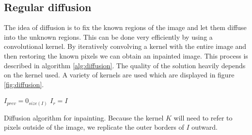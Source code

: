 \subsection{Regular diffusion}
The idea of diffusion is to fix the known regions of the image and let them diffuse into the unknown regions. This can be done very efficiently by using a convolutional kernel. By iteratively convolving a kernel with the entire image and then restoring the known pixels we can obtain an inpainted image. This process is described in algorithm \ref{alg:diffusion}. The quality of the solution heavily depends on the kernel used. A variety of kernels are used which are displayed in figure \ref{fig:diffusion}.

\begin{algorithm}
	$I_{prev} = 0_{size(I)}$\;
	$I_{r} = I$\;
	\quad
\caption{Diffusion algorithm for inpainting. Because the kernel $K$ will need to refer to pixels outside of the image, we replicate the outer borders of $I$ outward.}
\label{alg:diffusion}
\end{algorithm}